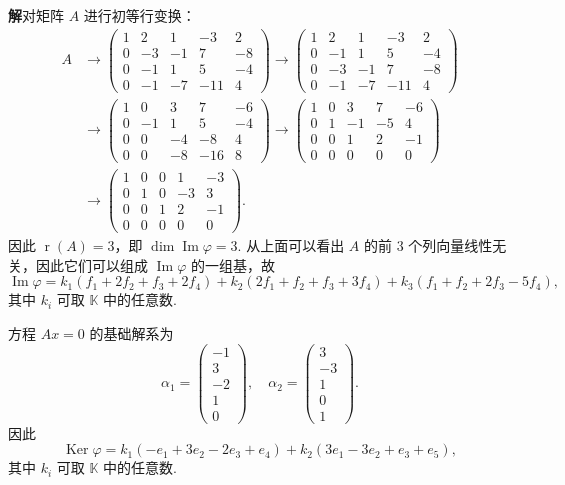 \documentclass[UTF8,12pt,a4paper,fontset=fandol]{ctexart}
\begin{document}
\noindent\textbf{解}\quad 对矩阵 $A$ 进行初等行变换：
\[
\begin{aligned}
A&\to
\left(\begin{array}{rrrrr}
1&2&1&-3&2\\
0&-3&-1&7&-8\\
0&-1&1&5&-4\\
0&-1&-7&-11&4
\end{array}\right)
\to
\left(\begin{array}{rrrrr}
1&2&1&-3&2\\
0&-1&1&5&-4\\
0&-3&-1&7&-8\\
0&-1&-7&-11&4
\end{array}\right)\\
&\to
\left(\begin{array}{rrrrr}
1&0&3&7&-6\\
0&-1&1&5&-4\\
0&0&-4&-8&4\\
0&0&-8&-16&8
\end{array}\right)
\to
\left(\begin{array}{rrrrr}
1&0&3&7&-6\\
0&1&-1&-5&4\\
0&0&1&2&-1\\
0&0&0&0&0
\end{array}\right)\\
&\to
\left(\begin{array}{rrrrr}
1&0&0&1&-3\\
0&1&0&-3&3\\
0&0&1&2&-1\\
0&0&0&0&0
\end{array}\right).
\end{aligned}
\]
因此 $\operatorname{r}(A)=3$，即 $\dim\operatorname{Im}\varphi=3$. 从上面可以看出 $A$ 的前 3 个列向量线性无关，因此它们可以组成 $\operatorname{Im}\varphi$ 的一组基，故
\[
\operatorname{Im}\varphi=k_1(f_1+2f_2+f_3+2f_4)+k_2(2f_1+f_2+f_3+3f_4)+k_3(f_1+f_2+2f_3-5f_4),
\]
其中 $k_i$ 可取 $\mathbb{K}$ 中的任意数.

方程 $Ax=0$ 的基础解系为
\[
\alpha_1=\left(\begin{array}{r}
-1\\
3\\
-2\\
1\\
0
\end{array}\right),\quad
\alpha_2=\left(\begin{array}{r}
3\\
-3\\
1\\
0\\
1
\end{array}\right).
\]
因此
\[
\operatorname{Ker}\varphi=k_1(-e_1+3e_2-2e_3+e_4)+k_2(3e_1-3e_2+e_3+e_5),
\]
其中 $k_i$ 可取 $\mathbb{K}$ 中的任意数.
\end{document}
